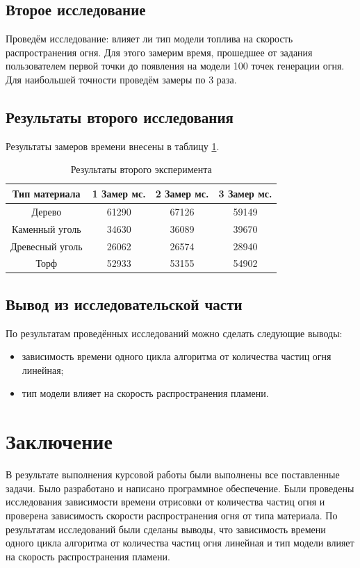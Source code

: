 \documentclass[a4paper,14pt]{report}
\begin{document}
\section{Второе исследование}
Проведём исследование: влияет ли тип модели топлива на скорость распространения огня.
Для этого замерим время, прошедшее от задания пользователем первой точки до появления на модели 100 точек генерации огня. Для наибольшей точности проведём замеры по 3 раза.

\section{Результаты второго исследования}
Результаты замеров времени внесены в таблицу \ref{tab:ref2}.
\newline

\begin{table}[h]
\label{tab:ref2} 
\caption{Результаты второго эксперимента}
\begin{center}
\begin{tabular}{ | c | c | c | c |}
\hline
Тип материала & 1 Замер мс. & 2 Замер мс. & 3 Замер мс. \\ \hline
Дерево & 61290 & 67126 & 59149 \\
Каменный уголь & 34630 & 36089 & 39670 \\
Древесный уголь & 26062 & 26574 & 28940\\
Торф & 52933 & 53155 & 54902\\
\hline
\end{tabular}
\end{center}
\end{table}
\section*{Вывод из исследовательской части}
По результатам проведённых исследований можно сделать следующие выводы:
\begin{itemize}
\item зависимость времени одного цикла алгоритма от количества частиц огня линейная;
\item тип модели влияет на скорость распространения пламени.

\end{itemize}


\chapter*{Заключение}
В результате выполнения курсовой работы были выполнены все поставленные задачи. Было разработано и написано программное обеспечение.
Были проведены исследования зависимости времени отрисовки от количества частиц огня и проверена зависимость скорости распространения огня от типа материала. По результатам исследований были сделаны выводы, что
зависимость времени одного цикла алгоритма от количества частиц огня линейная и
тип модели влияет на скорость распространения пламени.
 
\end{document}
